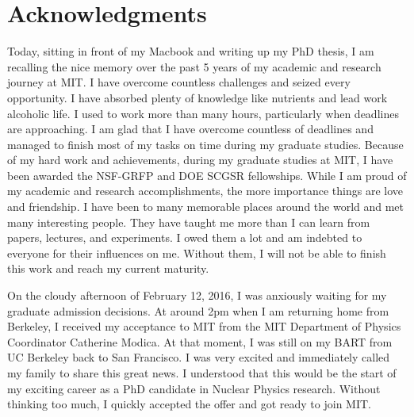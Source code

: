 \cleardoublepage
\setcounter{savepage}{\thepage}
\begin{abstractpage}

\end{abstractpage}

% 

\cleardoublepage

\section*{Acknowledgments}


Today, sitting in front of my Macbook and writing up my PhD thesis, I am recalling the nice memory over the past 5 years of my academic and research journey at MIT. I have overcome countless challenges and seized every opportunity. I have absorbed plenty of knowledge like nutrients and lead work alcoholic life. I used to work more than many hours, particularly when deadlines are approaching. I am glad that I have overcome countless of deadlines and managed to finish most of my tasks on time during my graduate studies. Because of my hard work and achievements, during my graduate studies at MIT, I have been awarded the NSF-GRFP and DOE SCGSR fellowships. While I am proud of my academic and research accomplishments, the more importance things are love and friendship. I have been to many memorable places around the world and met many interesting people. They have taught me more than I can learn from papers, lectures, and experiments. I owed them a lot and am indebted to everyone for their influences on me. Without them, I will not be able to finish this work and reach my current maturity.

On the cloudy afternoon of February 12, 2016, I was anxiously waiting for my graduate admission decisions. At around 2pm when I am returning home from Berkeley, I received my acceptance to MIT from the MIT Department of Physics Coordinator Catherine Modica. At that moment, I was still on my BART from UC Berkeley back to San Francisco. I was very excited and immediately called my family to share this great news. I understood that this would be the start of my exciting career as a PhD candidate in Nuclear Physics research. Without thinking too much, I quickly accepted the offer and got ready to join MIT.

